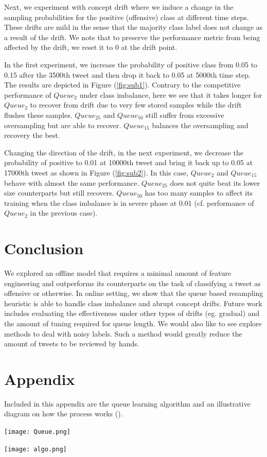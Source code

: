\documentclass{article}
\begin{document}
  Next, we experiment with concept drift where we induce a change in the sampling probabilities for the positive (offensive)
  class at different time steps. These drifts are mild in the sense that the majority class label does not change as a result of the drift.
  We note that to preserve the performance metric from being affected by the drift, we reset it to 0 at the drift point.

  In the first experiment, we increase the probability of positive class from 0.05 to 0.15 after the 3500th tweet and then drop it back to 0.05
  at 5000th time step. The results are depicted in Figure (\ref{fig:sub1}). Contrary to the competitive performance of \(Queue_2\) under class imbalance,
  here we see that it takes longer for \(Queue_2\) to recover from drift due to very few stored samples while the drift flushes these samples. 
  \(Queue_{25}\) and \(Queue_{50}\) still suffer from excessive oversampling but are able to recover. \(Queue_{15}\) balances the oversampling and recovery the best.
  
  Changing the direction of the drift, in the next experiment, we decrease the probability of positive to 0.01 at 10000th tweet and bring it back up to
  0.05 at 17000th tweet as shown in Figure (\ref{fig:sub2}). In this case, \(Queue_2\) and \(Queue_{15}\) behave with almost the same performance.
  \(Queue_{25}\) does not quite beat its lower size counterparts but still recovers. \(Queue_{50}\) has too many samples to affect its training when the
  class imbalance is in severe phase at 0.01 (cf. performance of \(Queue_2\) in the previous case).


  \section{Conclusion}
  We explored an offline model that requires a minimal amount of feature engineering and outperforms its counterparts on the task of classifying a tweet as
  offensive or otherwise. In online setting, we show that the queue based resampling heuristic is able to handle class imbalance and abrupt concept drifts.
  Future work includes evaluating the effectiveness under other types of drifts (eg. gradual) and the amount of tuning required for queue length. We would also like to see explore methods
  to deal with noisy labels. Such a method would greatly reduce the amount of tweets to be reviewed by hands.
  

  \newpage
  
  

  \newpage
  \section*{Appendix}
  Included in this appendix are the queue learning algorithm and an illustrative diagram on how the process works (\cite{Malialis2018QueueBasedRF}).
  \begin{center}
  \texttt{[image: Queue.png]}
  \end{center}
  \texttt{[image: algo.png]}
  
\end{document}
